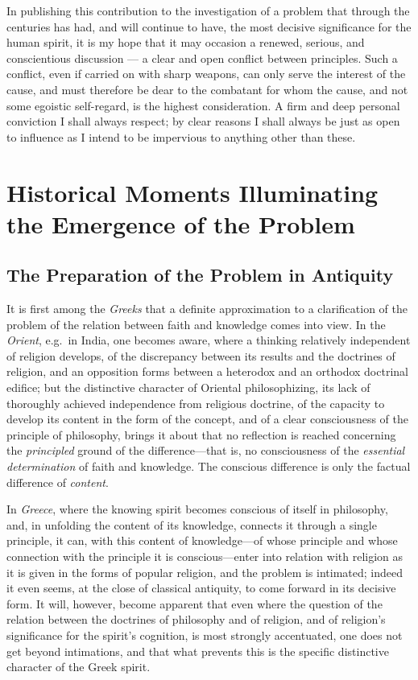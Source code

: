 \documentclass[12pt,a4paper]{book}
\begin{document}
In publishing this contribution to the investigation of a problem that
through the centuries has had, and will continue to have, the most
decisive significance for the human spirit, it is my hope that it may
occasion a renewed, serious, and conscientious discussion --- a clear
and open conflict between principles. Such a conflict, even if carried
on with sharp weapons, can only serve the interest of the cause, and
must therefore be dear to the combatant for whom the cause, and not
some egoistic self-regard, is the highest consideration. A firm and
deep personal conviction I shall always respect; by clear reasons I
shall always be just as open to influence as I intend to be impervious
to anything other than these.


\chapter{Historical Moments Illuminating the Emergence of the Problem}
\label{ch:historical}

\section{The Preparation of the Problem in Antiquity}
\label{sec:antiquity}

It is first among the \emph{Greeks} that a definite approximation to a
clarification of the problem of the relation between faith and knowledge
comes into view. In the \emph{Orient}, e.g.\ in India, one becomes aware,
where a thinking relatively independent of religion develops, of the
discrepancy between its results and the doctrines of religion, and an
opposition forms between a heterodox and an orthodox doctrinal edifice;
but the distinctive character of Oriental philosophizing, its lack of
thoroughly achieved independence from religious doctrine, of the
capacity to develop its content in the form of the concept, and of a
clear consciousness of the principle of philosophy, brings it about
that no reflection is reached concerning the \emph{principled} ground of the
difference---that is, no consciousness of the \emph{essential determination}
of faith and knowledge. The conscious difference is only the factual
difference of \emph{content}.

In \emph{Greece}, where the knowing spirit becomes conscious of itself in
philosophy, and, in unfolding the content of its knowledge, connects it
through a single principle, it can, with this content of knowledge---of
whose principle and whose connection with the principle it is
conscious---enter into relation with religion as it is given in the
forms of popular religion, and the problem is intimated; indeed it even
seems, at the close of classical antiquity, to come forward in its
decisive form. It will, however, become apparent that even where the
question of the relation between the doctrines of philosophy and of
religion, and of religion's significance for the spirit's cognition, is
most strongly accentuated, one does not get beyond intimations, and that
what prevents this is the specific distinctive character of the Greek
spirit.
\end{document}
